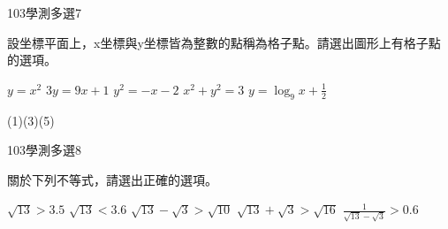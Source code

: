 \begin{QUESTIONS}
    \begin{QUESTION}
        \begin{ExamInfo}{103}{學測}{多選}{7}
        \end{ExamInfo}
        \begin{ExamAnsRateInfo}{62}{89}{65}{32}
        \end{ExamAnsRateInfo}
        \begin{QBODY}
            設坐標平面上，x坐標與y坐標皆為整數的點稱為格子點。請選出圖形上有格子點的選項。
			\begin{QOPS}
				\QOP $y={{x}^{2}}$
				\QOP $3y=9x+1$
				\QOP ${{y}^{2}}=-x-2$
				\QOP ${{x}^{2}}+{{y}^{2}}=3$
				\QOP $y={{\log }_{9}}x+\frac{1}{2}$
			\end{QOPS}
        \end{QBODY}
        \begin{QFROMS}
        \end{QFROMS}
        \begin{QTAGS}\end{QTAGS}
        \begin{QANS}
            (1)(3)(5)
        \end{QANS}
        \begin{QSOLLIST}
        \end{QSOLLIST}
        \begin{QEMPTYSPACE}
        \end{QEMPTYSPACE}
    \end{QUESTION}
    \begin{QUESTION}
        \begin{ExamInfo}{103}{學測}{多選}{8}
        \end{ExamInfo}
        \begin{ExamAnsRateInfo}{73}{92}{82}{45}
        \end{ExamAnsRateInfo}
        \begin{QBODY}
            關於下列不等式，請選出正確的選項。
			\begin{QOPS}
				\QOP $\sqrt{13}>3.5$
				\QOP $\sqrt{13}<3.6$
				\QOP $\sqrt{13}-\sqrt{3}>\sqrt{10}$
				\QOP $\sqrt{13}+\sqrt{3}>\sqrt{16}$
				\QOP $\frac{1}{\sqrt{13}-\sqrt{3}}>0.6$
			\end{QOPS}
        \end{QBODY}
        \begin{QFROMS}
        \end{QFROMS}
        \begin{QTAGS}\end{QTAGS}

\end{QUESTION}
\end{QUESTIONS}
